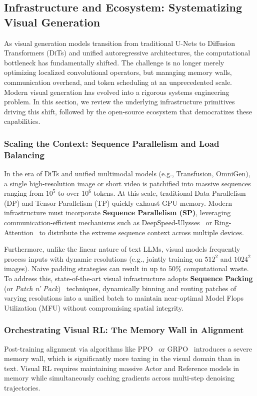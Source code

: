 \subsection{Infrastructure and Ecosystem: Systematizing Visual Generation}
\label{subsec:infrastructure_systems}

As visual generation models transition from traditional U-Nets to Diffusion Transformers (DiTs) and unified autoregressive architectures, the computational bottleneck has fundamentally shifted. The challenge is no longer merely optimizing localized convolutional operators, but managing memory walls, communication overhead, and token scheduling at an unprecedented scale. Modern visual generation has evolved into a rigorous systems engineering problem. In this section, we review the underlying infrastructure primitives driving this shift, followed by the open-source ecosystem that democratizes these capabilities.

\subsubsection{Scaling the Context: Sequence Parallelism and Load Balancing}
\label{subsubsec:infra_scaling_context}
In the era of DiTs and unified multimodal models (e.g., Transfusion, OmniGen), a single high-resolution image or short video is patchified into massive sequences ranging from $10^5$ to over $10^6$ tokens. At this scale, traditional Data Parallelism (DP) and Tensor Parallelism (TP) quickly exhaust GPU memory. Modern infrastructure must incorporate \textbf{Sequence Parallelism (SP)}, leveraging communication-efficient mechanisms such as DeepSpeed-Ulysses~\citep{jacobs2023deepspeed} or Ring-Attention~\citep{liu2023ring} to distribute the extreme sequence context across multiple devices.

Furthermore, unlike the linear nature of text LLMs, visual models frequently process inputs with dynamic resolutions (e.g., jointly training on $512^2$ and $1024^2$ images). Naive padding strategies can result in up to 50\% computational waste. To address this, state-of-the-art visual infrastructure adopts \textbf{Sequence Packing} (or \emph{Patch n' Pack})~\citep{dehghani2023patch} techniques, dynamically binning and routing patches of varying resolutions into a unified batch to maintain near-optimal Model Flops Utilization (MFU) without compromising spatial integrity.

\subsubsection{Orchestrating Visual RL: The Memory Wall in Alignment}
\label{subsubsec:infra_visual_rl}
Post-training alignment via algorithms like PPO~\citep{schulman2017proximal} or GRPO~\citep{shao2024deepseekmath} introduces a severe memory wall, which is significantly more taxing in the visual domain than in text. Visual RL requires maintaining massive Actor and Reference models in memory while simultaneously caching gradients across multi-step denoising trajectories.

